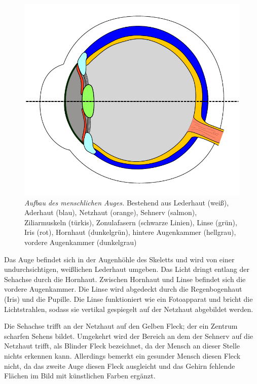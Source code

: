 \documentclass[12pt,a4paper]{article}
\begin{document}
\begin{figure}[!h]
  \begin{center}
    \includegraphics[scale=0.7]{imgs/eye.pdf}
    \caption[Querschnitt des menschlichen Auges]
        {\emph{Aufbau des menschlichen Auges.} Bestehend aus Lederhaut (weiß),
        Aderhaut (blau), Netzhaut (orange), Sehnerv (salmon), Ziliarmuskeln
        (türkis), Zonulafasern (schwarze Linien), Linse (grün), Iris (rot),
        Hornhaut (dunkelgrün), hintere Augenkammer (hellgrau), vordere
        Augenkammer (dunkelgrau)}
    \label{img:human_eye}
  \end{center}
\end{figure}

Das Auge befindet sich in der Augenhöhle des Skeletts und wird von einer
undurchsichtigen, weißlichen Lederhaut umgeben. Das Licht dringt entlang
der Sehachse durch die Hornhaut. Zwischen Hornhaut und Linse befindet sich
die vordere Augenkammer. Die Linse wird abgedeckt durch die Regenbogenhaut
(Iris) und die Pupille. Die Linse funktioniert wie ein Fotoapparat und
bricht die Lichtstrahlen, sodass sie vertikal gespiegelt auf der Netzhaut
abgebildet werden.

Die Sehachse trifft an der Netzhaut auf den Gelben
Fleck; der ein Zentrum scharfen Sehens bildet. Umgekehrt wird der Bereich
an dem der Sehnerv auf die Netzhaut trifft, als Blinder Fleck bezeichnet,
da der Mensch an dieser Stelle nichts erkennen kann. Allerdings bemerkt ein
gesunder Mensch diesen Fleck nicht, da das zweite Auge diesen Fleck
ausgleicht und das Gehirn fehlende Flächen im Bild mit künstlichen Farben
ergänzt.
\end{document}
